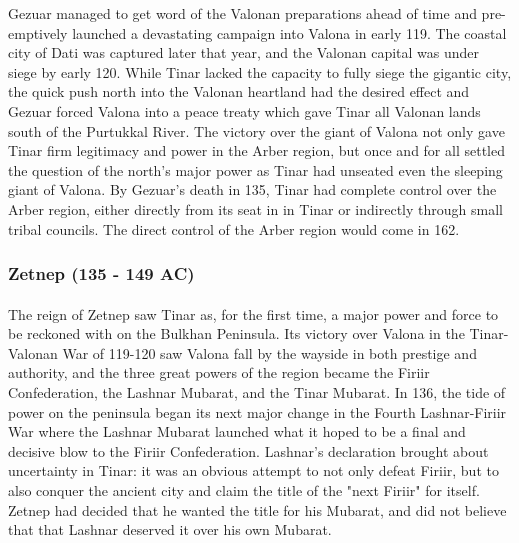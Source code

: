 					Gezuar managed to get word of the Valonan preparations ahead of time and pre-emptively launched a devastating campaign into Valona in early 119. The coastal city of Dati was captured later that year, and the Valonan capital was under siege by early 120. While Tinar lacked the capacity to fully siege the gigantic city, the quick push north into the Valonan heartland had the desired effect and Gezuar forced Valona into a peace treaty which gave Tinar all Valonan lands south of the Purtukkal River. The victory over the giant of Valona not only gave Tinar firm legitimacy and power in the Arber region, but once and for all settled the question of the north's major power as Tinar had unseated even the sleeping giant of Valona. By Gezuar's death in 135, Tinar had complete control over the Arber region, either directly from its seat in in Tinar or indirectly through small tribal councils. The direct control of the Arber region would come in 162.
			\subsubsection{Zetnep (135 - 149 AC)}
				\paragraph{}
					The reign of Zetnep saw Tinar as, for the first time, a major power and force to be reckoned with on the Bulkhan Peninsula. Its victory over Valona in the Tinar-Valonan War of 119-120 saw Valona fall by the wayside in both prestige and authority, and the three great powers of the region became the Firiir Confederation, the Lashnar Mubarat, and the Tinar Mubarat. In 136, the tide of power on the peninsula began its next major change in the Fourth Lashnar-Firiir War where the Lashnar Mubarat launched what it hoped to be a final and decisive blow to the Firiir Confederation. Lashnar's declaration brought about uncertainty in Tinar: it was an obvious attempt to not only defeat Firiir, but to also conquer the ancient city and claim the title of the "next Firiir" for itself. Zetnep had decided that he wanted the title for his Mubarat, and did not believe that that Lashnar deserved it over his own Mubarat.
					
